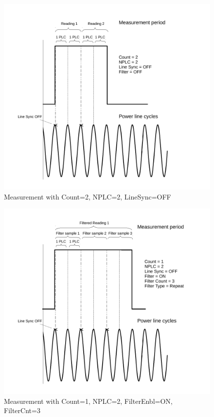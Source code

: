 \documentclass[openany]{article}
\begin{document}
		\begin{figure}[!h]
		\caption{Measurement with Count=2, NPLC=2, LineSync=OFF}
		\label{fig:meas-param2}
		\centering
		\includegraphics[width=1.0\textwidth]{dcct-meas-param2-image}
		\end{figure}

		\begin{figure}[!h]
		\caption{Measurement with Count=1, NPLC=2, FilterEnbl=ON, FilterCnt=3}
		\label{fig:meas-param3}
		\centering
		\includegraphics[width=1.0\textwidth]{dcct-meas-param3-image}
		\end{figure}
\FloatBarrier
\end{document}
